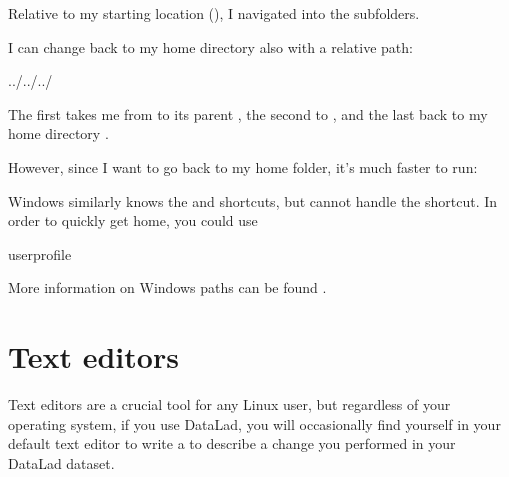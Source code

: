 \sphinxAtStartPar
Relative to my starting location (), I navigated into the subfolders.

\sphinxAtStartPar
I can change back to my home directory also with a relative path:

\begin{sphinxVerbatim}[commandchars=\\\{\}]
../../../
\end{sphinxVerbatim}

\sphinxAtStartPar
The first  takes me from  to its parent , the
second  to , and the last 
back to my home directory .

\sphinxAtStartPar
However, since I want to go back to my home folder, it’s much faster to run:

\begin{sphinxVerbatim}[commandchars=\\\{\}]
\PYGZti{}
\end{sphinxVerbatim}

\sphinxAtStartPar
Windows similarly knows the  and  shortcuts, but cannot handle the \sphinxcode{\sphinxupquote{\textasciitilde{}}} shortcut.
In order to quickly get home, you could use

\begin{sphinxVerbatim}[commandchars=\\\{\}]
\PYGZpc{}userprofile\PYGZpc{}
\end{sphinxVerbatim}

\sphinxAtStartPar
More information on Windows paths can be found .

\ignorespaces 

\section{Text editors}
\label{\detokenize{intro/howto:text-editors}}\label{\detokenize{intro/howto:index-6}}
\sphinxAtStartPar
Text editors are a crucial tool for any Linux user, but regardless of your operating system,
if you use DataLad, you will occasionally find yourself in your default text editor to write
a {\hyperref[\detokenize{glossary:term-commit-message}]{}} to describe a change you performed in your DataLad dataset.

